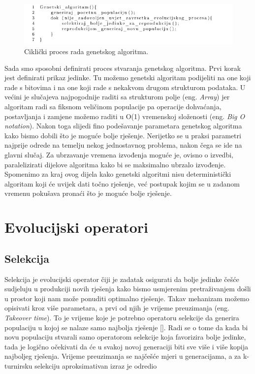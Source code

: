\documentclass[times, utf8, zavrsni]{fer}
\begin{document}
\begin{figure}[!htb]
	\centering
	\includegraphics[width=15cm]{slike/nenrGenAlg.png}
	\caption{Ciklički proces rada genetskog algoritma. }
	\label{fig:nenr-alg}
\end{figure}


Sada smo sposobni definirati proces stvaranja genetskog algoritma. Prvi korak jest definirati prikaz jedinke. Tu možemo genetski algoritam podijeliti na one koji rade s bitovima i na one koji rade s nekakvom drugom strukturom podataka. U većini je slučajeva najpogodnije raditi sa strukturom polje (eng. \emph{Array}) jer algoritam radi sa fiksnom veličinom populacije pa operacije dohvaćanja, postavljanja i zamjene možemo raditi u O(1) vremenskoj složenosti (eng. \emph{Big O notation}). Nakon toga slijedi fino podešavanje parametara genetskog algoritma kako bismo dobili što je moguće bolje rješenje. Nerijetko se u praksi parametri najprije odrede na temelju nekog jednostavnog problema, nakon čega se ide na glavni slučaj. Za ubrzavanje vremena izvođenja moguće je, ovisno o izvedbi, paralelizirati dijelove algoritma kako bi se maksimalno ubrzalo izvođenje. Spomenimo za kraj ovog dijela kako genetski algoritmi nisu deterministički algoritam koji će uvijek dati točno rješenje, već postupak kojim se u zadanom vremenu pokušava pronaći što je moguće bolje rješenje. 

\section{Evolucijski operatori}

\subsection{Selekcija}

Selekcija je evolucijski operator čiji je zadatak osigurati da bolje jedinke češće sudjeluju u produkciji novih rješenja kako bismo usmjerenim pretraživanjem došli u prostor koji nam može ponuditi optimalno rješenje. Takav mehanizam možemo opisivati kroz više parametara, a prvi od njih je vrijeme preuzimanja (eng. \emph{Takeover time}). To je vrijeme koje je potrebno operatoru selekcije da generira populaciju u kojoj se nalaze samo najbolja rješenje [\citet{GoldAndDeb}]. Radi se o tome da kada bi novu populaciju stvarali samo operatorom selekcije koja favorizira bolje jedinke, tada je logično očekivati da će u svakoj novoj generaciji biti sve više i više kopija najboljeg rješenja. Vrijeme preuzimanja se najčešće mjeri u generacijama, a za k-turnirsku selekciju aproksimativan izraz je odredio \citet{EvAlgsinTheoryAndPractise} 
\end{document}
